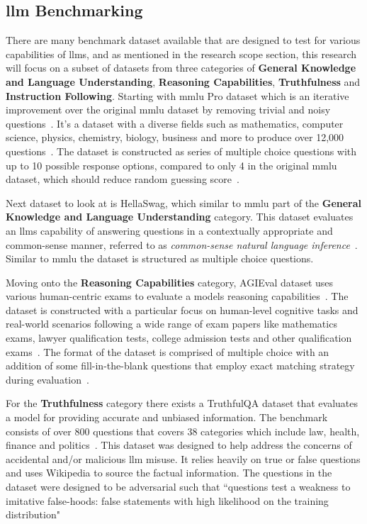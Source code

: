 \documentclass{ifacconf}
\begin{document}
	\subsection{\gls{llm} Benchmarking}
	
	There are many benchmark dataset available that are designed to test for various capabilities of \glspl{llm}, and as mentioned in the research scope section, this research will focus on a subset of datasets from three categories of \textbf{General Knowledge and Language Understanding}, \textbf{Reasoning Capabilities}, \textbf{Truthfulness} and \textbf{Instruction Following}. Starting with \gls{mmlu} Pro dataset which is an iterative improvement over the original \gls{mmlu} dataset by removing trivial and noisy questions~\cite{wang2024mmluprorobustchallengingmultitask}. It's a dataset with a diverse fields such as mathematics, computer science, physics, chemistry, biology, business and more to produce over 12,000 questions~\cite{wang2024mmluprorobustchallengingmultitask}. The dataset is constructed as series of multiple choice questions with up to 10 possible response options, compared to only 4 in the original \gls{mmlu} dataset, which should reduce random guessing score~\cite{mmluprohuggingface}.
	
	Next dataset to look at is HellaSwag, which similar to \gls{mmlu} part of the \textbf{General Knowledge and Language Understanding} category. This dataset evaluates an \glspl{llm} capability of answering questions in a contextually appropriate and common-sense manner, referred to as \textit{common-sense natural language inference}~\cite{zellers2019hellaswagmachinereallyfinish}. Similar to \gls{mmlu} the dataset is structured as multiple choice questions.
	
	Moving onto the \textbf{Reasoning Capabilities} category, AGIEval dataset uses various human-centric exams to evaluate a models reasoning capabilities~\cite{zhong2023agievalhumancentricbenchmarkevaluating}. The dataset is constructed with a particular focus on human-level cognitive tasks and real-world scenarios following a wide range of exam papers like mathematics exams, lawyer qualification tests, college admission tests and other qualification exams~\cite[p.~5]{zhong2023agievalhumancentricbenchmarkevaluating}. The format of the dataset is comprised of multiple choice with an addition of some fill-in-the-blank questions that employ exact matching strategy during evaluation~\cite[p.~6]{zhong2023agievalhumancentricbenchmarkevaluating}.
	
	For the \textbf{Truthfulness} category there exists a TruthfulQA dataset that evaluates a model for providing accurate and unbiased information. The benchmark consists of over 800 questions that covers 38 categories which include law, health, finance and politics~\cite{lin2022truthfulqameasuringmodelsmimic}. This dataset was designed to help address the concerns of accidental and/or malicious \gls{llm} misuse. It relies heavily on true or false questions and uses Wikipedia to source the factual information. The questions in the dataset were designed to be adversarial such that ``questions test a weakness to imitative false-hoods: false statements with high likelihood on the training distribution"~\cite[p.~4]{lin2022truthfulqameasuringmodelsmimic}
	
\end{document}
